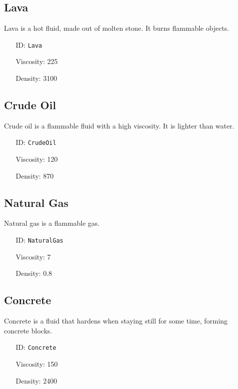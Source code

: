 \subsection{Lava}\label{subsec:fluids_lava}
Lava is a hot fluid, made out of molten stone. It burns flammable objects.
\newline
\begin{itemize}[nosep]
    \item[ID:] \texttt{Lava}
    \item[Viscosity:] 225
    \item[Density:] 3100
\end{itemize}

\subsection{Crude Oil}\label{subsec:fluids_crude oil}
Crude oil is a flammable fluid with a high viscosity. It is lighter than water.
\newline
\begin{itemize}[nosep]
    \item[ID:] \texttt{CrudeOil}
    \item[Viscosity:] 120
    \item[Density:] 870
\end{itemize}

\subsection{Natural Gas}\label{subsec:fluids_natural gas}
Natural gas is a flammable gas.
\newline
\begin{itemize}[nosep]
    \item[ID:] \texttt{NaturalGas}
    \item[Viscosity:] 7
    \item[Density:] 0.8
\end{itemize}

\subsection{Concrete}\label{subsec:fluids_concrete}
Concrete is a fluid that hardens when staying still for some time, forming concrete blocks.
\newline
\begin{itemize}[nosep]
    \item[ID:] \texttt{Concrete}
    \item[Viscosity:] 150
    \item[Density:] 2400
\end{itemize}

